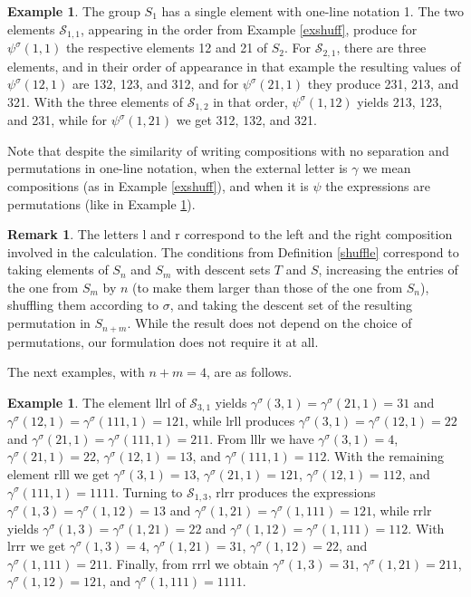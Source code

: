 \documentclass{article}
\theoremstyle{definition}
\newtheorem{rmk}[thm]{Remark}
\newtheorem{ex}[thm]{Example}
\begin{document}
\begin{ex}
The group $S_{1}$ has a single element with one-line notation 1. The two elements $\mathcal{S}_{1,1}$, appearing in the order from Example \ref{exshuff}, produce for $\psi^{\sigma}(1,1)$ the respective elements 12 and 21 of $S_{2}$. For $\mathcal{S}_{2,1}$, there are three elements, and in their order of appearance in that example the resulting values of $\psi^{\sigma}(12,1)$ are 132, 123, and 312, and for $\psi^{\sigma}(21,1)$ they produce 231, 213, and 321. With the three elements of $\mathcal{S}_{1,2}$ in that order, $\psi^{\sigma}(1,12)$ yields 213, 123, and 231, while for $\psi^{\sigma}(1,21)$ we get 312, 132, and 321. \label{permshuff}
\end{ex}
Note that despite the similarity of writing compositions with no separation and permutations in one-line notation, when the external letter is $\gamma$ we mean compositions (as in Example \ref{exshuff}), and when it is $\psi$ the expressions are permutations (like in Example \ref{permshuff}).
\begin{rmk}
The letters l and r correspond to the left and the right composition involved in the calculation. The conditions from Definition \ref{shuffle} correspond to taking elements of $S_{n}$ and $S_{m}$ with descent sets $T$ and $S$, increasing the entries of the one from $S_{m}$ by $n$ (to make them larger than those of the one from $S_{n}$), shuffling them according to $\sigma$, and taking the descent set of the resulting permutation in $S_{n+m}$. While the result does not depend on the choice of permutations, our formulation does not require it at all. \label{withperms}
\end{rmk}
The next examples, with $n+m=4$, are as follows.
\begin{ex}
The element llrl of $\mathcal{S}_{3,1}$ yields $\gamma^{\sigma}(3,1)=\gamma^{\sigma}(21,1)=31$ and $\gamma^{\sigma}(12,1)=\gamma^{\sigma}(111,1)=121$, while lrll produces $\gamma^{\sigma}(3,1)=\gamma^{\sigma}(12,1)=22$ and $\gamma^{\sigma}(21,1)=\gamma^{\sigma}(111,1)=211$. From lllr we have $\gamma^{\sigma}(3,1)=4$, $\gamma^{\sigma}(21,1)=22$, $\gamma^{\sigma}(12,1)=13$, and $\gamma^{\sigma}(111,1)=112$. With the remaining element rlll we get $\gamma^{\sigma}(3,1)=13$, $\gamma^{\sigma}(21,1)=121$, $\gamma^{\sigma}(12,1)=112$, and $\gamma^{\sigma}(111,1)=1111$. Turning to $\mathcal{S}_{1,3}$, rlrr produces the expressions $\gamma^{\sigma}(1,3)=\gamma^{\sigma}(1,12)=13$ and $\gamma^{\sigma}(1,21)=\gamma^{\sigma}(1,111)=121$, while rrlr yields $\gamma^{\sigma}(1,3)=\gamma^{\sigma}(1,21)=22$ and $\gamma^{\sigma}(1,12)=\gamma^{\sigma}(1,111)=112$. With lrrr we get $\gamma^{\sigma}(1,3)=4$, $\gamma^{\sigma}(1,21)=31$, $\gamma^{\sigma}(1,12)=22$, and $\gamma^{\sigma}(1,111)=211$. Finally, from rrrl we obtain $\gamma^{\sigma}(1,3)=31$, $\gamma^{\sigma}(1,21)=211$, $\gamma^{\sigma}(1,12)=121$, and $\gamma^{\sigma}(1,111)=1111$. \label{shuffex}
\end{ex}
\end{document}
